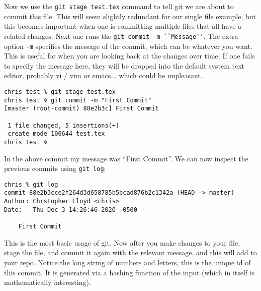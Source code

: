 \documentclass{article}
\begin{document}
Now we use the \lstinline{git stage test.tex} command to tell git we
are about to commit this file. This will seem slightly redundant for
our single file example, but this becomes important when one is
committing multiple files that all have a related changes. Next one
runs the \lstinline{git commit -m ``Message''}. The extra option
\lstinline{-m} specifies the message of the commit, which can be
whatever you want. This is useful for when you are looking back at the
changes over time. If one fails to specify the message here, they will
be dropped into the default system text editor, probably vi / vim or emacs...
which could be unpleasant.
\begin{lstlisting}
chris test % git stage test.tex
chris test % git commit -m "First Commit"
[master (root-commit) 88e2b3c] First Commit

 1 file changed, 5 insertions(+)
 create mode 100644 test.tex
chris test % 
\end{lstlisting}
In the above commit my message was ``First Commit''. We can now inspect the
previous commits using \lstinline{git log}:


\begin{lstlisting}
chris % git log
commit 88e2b3cce2f264d3d658785b5bcad876b2c1342a (HEAD -> master)
Author: Chrstopher Lloyd <chris>
Date:   Thu Dec 3 14:26:46 2020 -0500

    First Commit

\end{lstlisting}
This is the most basic usage of git. Now after you make changes to your
file, stage the file, and commit it again with the relevant
message, and this will add to your repo. Notice the long string of
numbers and letters, this is the unique id of this commit. It is
generated via a hashing function of the input (which in itself is
mathematically interesting).
\end{document}
